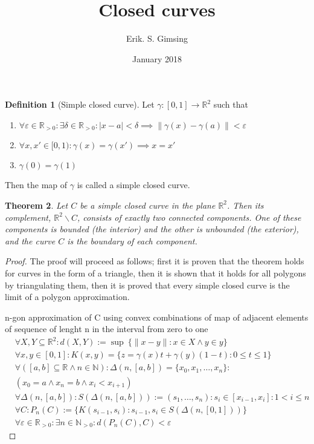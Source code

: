 \documentclass{article}
\title{Closed curves}
\author{Erik. S. Gimsing}
\date{January 2018}
\theoremstyle{plain}
\newtheorem{theorem}{Theorem}
\theoremstyle{definition}
\newtheorem{definition}[theorem]{Definition}
\newcommand{\R}{\mathbb{R}}
\newcommand{\N}{\mathbb{N}}
\begin{document}
\maketitle
\begin{definition}[Simple closed curve]
	Let $\gamma : [0,1] \rightarrow \R^2$ such that
	\begin{enumerate}
		\item $\forall \varepsilon \in \R_{>0}: \exists \delta \in
			\R_{>0}: |x-a| < \delta \implies 
			\|\gamma(x)-\gamma(a)\|<\varepsilon$
		\item $\forall x,x' \in [0,1): \gamma(x) = \gamma(x') 
			\implies x = x'$
		\item $\gamma(0) = \gamma(1)$
	\end{enumerate}
	Then the map of $\gamma$ is called a simple closed curve.
\end{definition}
\begin{theorem}
	Let $C$ be a simple closed curve in the plane $\R^2$. Then its
	complement, $\R^2\backslash C$, consists of exactly two connected
	components. One of these components is bounded (the interior)
	and the other is unbounded (the exterior), and the curve $C$
	is the boundary of each component.
\end{theorem}
\begin{proof}
	The proof will proceed as follows; first it is proven that the
	theorem holds for curves in the form of a triangle, then it
	is shown that it holds for all polygons by triangulating them,
	then it is proved that every simple closed curve is the limit
	of a polygon approximation.
	
	n-gon approximation of C using convex combinations of map of
	adjacent elements of sequence of lenght n in the
	interval from zero to one
	\begin{equation}
	\begin{aligned}
		&\forall X,Y \subseteq \R^2: d(X,Y) := \sup\ \{\|x-y\|:x\in X \land y 
		\in y\} \\
		&\forall x,y \in [0,1]: K(x,y) = \{z=\gamma(x)t+\gamma(y)(1-t)
		:0\leq t \leq 1\} \\
		&\forall ([a,b] \subseteq \R \land n \in \N): 
		\Delta(n,[a,b]) = \{x_0,x_1,\dots,x_n\}:\\ 
		&(x_0=a \land x_n = b \land x_i<x_{i+1}) \\
		&\forall \Delta(n,[a,b]): S(\Delta(n,[a,b])) := (s_1,\dots,s_n):
		s_i\in [x_{i-1},x_i]: 1<i\leq n\\
		&\forall C: P_n(C) := \{K(s_{i-1},s_i):s_{i-1},s_i\in 
		S(\Delta(n,[0,1]))\}\\
		&\forall \varepsilon \in \R_{>0}: \exists n \in \N_{>0} : d(P_n(C),C)<
		\varepsilon
	\end{aligned}
	\end{equation}
\end{proof}
\end{document}
